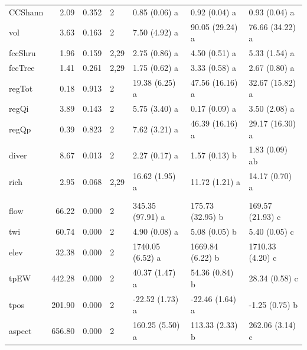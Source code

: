 \begin{table}
\begin{tabular}{lrrllll}
\hspace{1em}CCShann & 2.09 & 0.352 & 2 & 0.85 (0.06) a & 0.92 (0.04) a & 0.93 (0.04) a\\
\hspace{1em}vol & 3.63 & 0.163 & 2 & 7.50 (4.92) a & 90.05 (29.24) a & 76.66 (34.22) a\\
\hspace{1em}fccShru & 1.96 & 0.159 & 2,29 & 2.75 (0.86) a & 4.50 (0.51) a & 5.33 (1.54) a\\
\hspace{1em}fccTree & 1.41 & 0.261 & 2,29 & 1.75 (0.62) a & 3.33 (0.58) a & 2.67 (0.80) a\\
\hspace{1em}regTot & 0.18 & 0.913 & 2 & 19.38 (6.25) a & 47.56 (16.16) a & 32.67 (15.82) a\\
\hspace{1em}regQi & 3.89 & 0.143 & 2 & 5.75 (3.40) a & 0.17 (0.09) a & 3.50 (2.08) a\\
\hspace{1em}regQp & 0.39 & 0.823 & 2 & 7.62 (3.21) a & 46.39 (16.16) a & 29.17 (16.30) a\\
\hspace{1em}diver & 8.67 & 0.013 & 2 & 2.27 (0.17) a & 1.57 (0.13) b & 1.83 (0.09) ab\\
\hspace{1em}rich & 2.95 & 0.068 & 2,29 & 16.62 (1.95) a & 11.72 (1.21) a & 14.17 (0.70) a\\
\addlinespace[0.3em]
\multicolumn{7}{l}{\textbf{Environmental}}\\
\hspace{1em}flow & 66.22 & 0.000 & 2 & 345.35 (97.91) a & 175.73 (32.95) b & 169.57 (21.93) c\\
\hspace{1em}twi & 60.74 & 0.000 & 2 & 4.90 (0.08) a & 5.08 (0.05) b & 5.40 (0.05) c\\
\hspace{1em}elev & 32.38 & 0.000 & 2 & 1740.05 (6.52) a & 1669.84 (6.22) b & 1710.33 (4.20) c\\
\hspace{1em}tpEW & 442.28 & 0.000 & 2 & 40.37 (1.47) a & 54.36 (0.84) b & 28.34 (0.58) c\\
\hspace{1em}tpos & 201.90 & 0.000 & 2 & -22.52 (1.73) a & -22.46 (1.64) a & -1.25 (0.75) b\\
\hspace{1em}aspect & 656.80 & 0.000 & 2 & 160.25 (5.50) a & 113.33 (2.33) b & 262.06 (3.14) c\\

\end{tabular}
\end{table}
